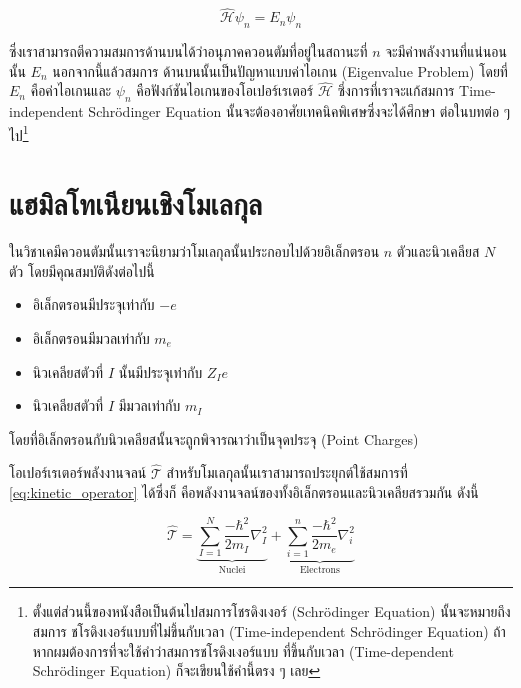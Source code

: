 \begin{equation}
    \hat{\mathscr{H}} \psi_n = E_n \psi_n
\end{equation}

\noindent ซึ่งเราสามารถตีความสมการด้านบนได้ว่าอนุภาคควอนตัมที่อยู่ในสถานะที่ $n$ จะมีค่าพลังงานที่แน่นอนนั้น $E_n$ นอกจากนี้แล้วสมการ%
ด้านบนนั้นเป็นปัญหาแบบค่าไอเกน (Eigenvalue Problem) โดยที่ $E_n$ คือค่าไอเกนและ $\psi_n$ คือฟังก์ชันไอเกนของโอเปอร์เรเตอร์
$\hat{\mathscr{H}}$ ซึ่งการที่เราจะแก้สมการ Time-independent Schr\"{o}dinger Equation นั้นจะต้องอาศัยเทคนิคพิเศษซึ่งจะได้ศึกษา%
ต่อในบทต่อ ๆ ไป\footnote{ตั้งแต่ส่วนนี้ของหนังสือเป็นต้นไปสมการโชรดิงเงอร์ (Schr\"{o}dinger Equation) นั้นจะหมายถึงสมการ%
ชโรดิงเงอร์แบบที่ไม่ขึ้นกับเวลา (Time-independent Schr\"{o}dinger Equation) ถ้าหากผมต้องการที่จะใช้คำว่าสมการชโรดิงเงอร์แบบ%
ที่ขึ้นกับเวลา (Time-dependent Schr\"{o}dinger Equation) ก็จะเขียนใช้คำนี้ตรง ๆ เลย}

\section{แฮมิลโทเนียนเชิงโมเลกุล}

ในวิชาเคมีควอนตัมนั้นเราจะนิยามว่าโมเลกุลนั้นประกอบไปด้วยอิเล็กตรอน $n$ ตัวและนิวเคลียส $N$ ตัว โดยมีคุณสมบัติดังต่อไปนี้

\begin{itemize}[topsep=0pt,noitemsep]
    \setlength\itemsep{1em}
    \item อิเล็กตรอนมีประจุเท่ากับ $-e$

    \item อิเล็กตรอนมีมวลเท่ากับ $m_e$

    \item นิวเคลียสตัวที่ $I$ นั้นมีประจุเท่ากับ $Z_I e$

    \item นิวเคลียสตัวที่ $I$ มีมวลเท่ากับ $m_I$
\end{itemize}

\noindent โดยที่อิเล็กตรอนกับนิวเคลียสนั้นจะถูกพิจารณาว่าเป็นจุดประจุ (Point Charges)

โอเปอร์เรเตอร์พลังงานจลน์ $\hat{\mathscr{T}}$ สำหรับโมเลกุลนั้นเราสามารถประยุกต์ใช้สมการที่ \ref{eq:kinetic_operator} ได้ซึ่งก็%
คือพลังงานจลน์ของทั้งอิเล็กตรอนและนิวเคลียสรวมกัน ดังนี้

\begin{equation}
    \label{eq:kinetic_operator_molecule}
    \hat{\mathscr{T}}
    =
    \underbrace
    {
        \sum_{I=1}^N \frac{-\hbar^2}{2 m_I} \nabla_I^2
    }_
    {
        \text{Nuclei}
    }
    + \underbrace
    {
        \sum_{i=1}^n \frac{-\hbar^2}{2 m_e} \nabla_i^2
    }_
    {
        \text{Electrons}
    }
\end{equation}

